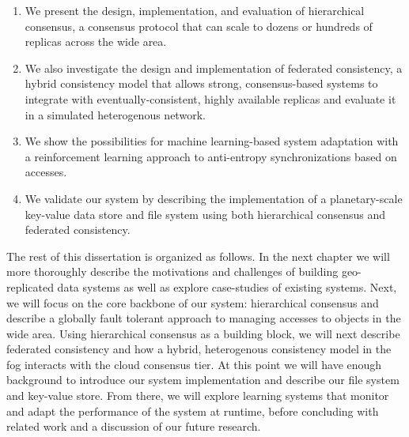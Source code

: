 \begin{enumerate}
    \item We present the design, implementation, and evaluation of hierarchical consensus, a consensus protocol that can scale to dozens or hundreds of replicas across the wide area.
    \item We also investigate the design and implementation of federated consistency, a hybrid consistency model that allows strong, consensus-based systems to integrate with eventually-consistent, highly available replicas and evaluate it in a simulated heterogenous network.
    \item We show the possibilities for machine learning-based system adaptation with a reinforcement learning approach to anti-entropy synchronizations based on accesses.
    \item We validate our system by describing the implementation of a planetary-scale key-value data store and file system using both hierarchical consensus and federated consistency.
\end{enumerate}



The rest of this dissertation is organized as follows.
In the next chapter we will more thoroughly describe the motivations and challenges of building geo-replicated data systems as well as explore case-studies of existing systems.
Next, we will focus on the core backbone of our system: hierarchical consensus and describe a globally fault tolerant approach to managing accesses to objects in the wide area.
Using hierarchical consensus as a building block, we will next describe federated consistency and how a hybrid, heterogenous consistency model in the fog interacts with the cloud consensus tier.
At this point we will have enough background to introduce our system implementation and describe our file system and key-value store.
From there, we will explore learning systems that monitor and adapt the performance of the system at runtime, before concluding with related work and a discussion of our future research.
